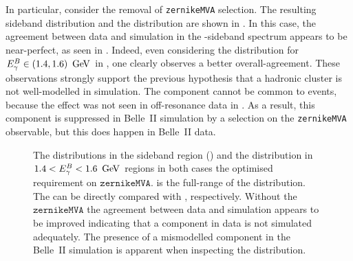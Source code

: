 In particular, consider the removal of \texttt{zernikeMVA} selection.
The resulting \EB sideband distribution and the \Mbc distribution are shown in .
In this case, the agreement between data and simulation in the \EB-sideband spectrum appears to be near-perfect, as seen in .
Indeed, even considering the \Mbc distribution for ${E^B_{\gamma}}\in(1.4,1.6)~\mathrm{\,Ge\kern -0.1em V}$ in , one clearly observes a better overall-agreement.
These observations strongly support the previous hypothesis that a hadronic cluster is not well-modelled in simulation.
The component cannot be common to \epem\ra\qqbar events, because the effect was not seen in off-resonance data in .
As a result, this component is suppressed in Belle~II simulation by a selection on the \texttt{zernikeMVA} observable, but this does happen in Belle~II data.
\begin{figure}[htbp!]
    \caption{\label{fig:nozmva_test}   The \EB distributions in the \EB sideband region ()
    and the \Mbc distribution in $1.4<{E^B_{\gamma}}<1.6~\mathrm{\,Ge\kern -0.1em V}$ regions in both cases the optimised requirement on $\mathtt{zernikeMVA}$.
     is the full-range of the \ZMVA distribution.
    The  can be directly compared with , respectively.
    Without the $\mathtt{zernikeMVA}$ the agreement between data and simulation appears to be improved indicating that a component in data is not simulated adequately.
    The presence of a mismodelled component in the Belle~II simulation is apparent when inspecting the \ZMVA distribution.
    }
\end{figure}

